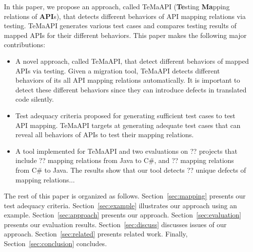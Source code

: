 In this paper, we propose an approach, called TeMaAPI (\textbf{Te}sting \textbf{Ma}pping relations of \textbf{API}s), that detects different behaviors of API mapping relations via testing. TeMaAPI generates various test cases and compares testing results of mapped APIs for their different behaviors. This paper makes the following major contributions:

\begin{itemize}\vspace*{-1.5ex}
\item A novel approach, called TeMaAPI, that detect different behaviors of mapped APIs via testing. Given a migration tool, TeMaAPI detects different behaviors of its all API mapping relations automatically. It is important to detect these different behaviors since they can introduce defects in translated code silently.\vspace*{-1.5ex}
\item Test adequacy criteria proposed for generating sufficient test cases to test API mapping. TeMaAPI targets at generating adequate test cases that can reveal all behaviors of APIs to test their mapping relations.\vspace*{-1.5ex}
\item A tool implemented for TeMaAPI and two
evaluations on ?? projects that include ?? mapping relations from Java to C\#, and ?? mapping relations from C\# to Java. The results show that our tool detects ?? unique defects of mapping relations...
\end{itemize}\vspace*{-1.5ex}

The rest of this paper is organized as follows.
Section~\ref{sec:mapping} presents our test adequacy criteria.
Section~\ref{sec:example} illustrates our approach using an example.
Section~\ref{sec:approach} presents our approach.
Section~\ref{sec:evaluation} presents our evaluation results.
Section~\ref{sec:discuss} discusses issues of our approach.
Section~\ref{sec:related} presents related work.
Finally, Section~\ref{sec:conclusion} concludes.
